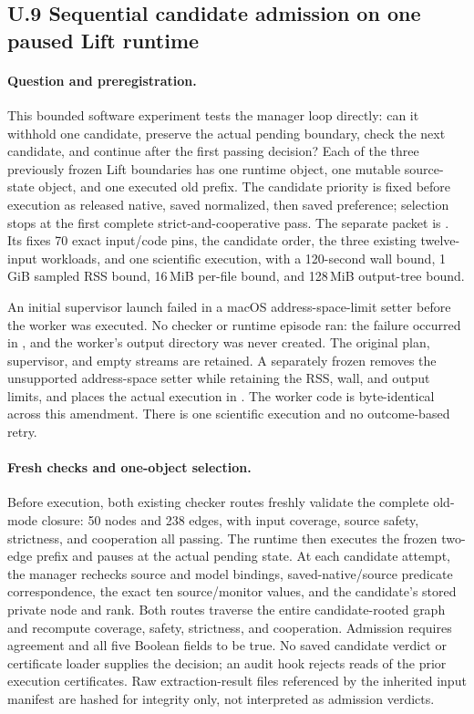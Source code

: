 \subsection*{U.9 Sequential candidate admission on one paused Lift runtime}
\label{supp:sequential-lift-manager}

\paragraph{Question and preregistration.}
This bounded software experiment tests the manager loop directly: can it
withhold one candidate, preserve the actual pending boundary, check the
next candidate, and continue after the first passing decision?
Each of the three previously frozen Lift boundaries has one runtime object,
one mutable source-state object, and one executed old prefix.
The candidate priority is fixed before execution as released native,
saved normalized, then saved preference; selection stops at the first
complete strict-and-cooperative pass.
The separate packet is
.
Its  fixes 70 exact input/code pins, the candidate order,
the three existing twelve-input workloads, and one scientific execution,
with a 120-second wall bound, 1\,GiB sampled RSS bound, 16\,MiB per-file
bound, and 128\,MiB output-tree bound.

An initial supervisor launch failed in a macOS address-space-limit
setter before the worker was executed. No checker or runtime episode
ran: the failure occurred in , and the worker's output
directory was never created. The original plan, supervisor, and empty
streams are retained. A separately frozen 
removes the unsupported address-space setter while retaining the RSS,
wall, and output limits, and places the actual execution in
. The worker code is byte-identical across this amendment.
There is one scientific execution and no outcome-based retry.

\paragraph{Fresh checks and one-object selection.}
Before execution, both existing checker routes freshly validate the
complete old-mode closure: 50 nodes and 238 edges, with input coverage,
source safety, strictness, and cooperation all passing.
The runtime then executes the frozen two-edge prefix and pauses at the
actual pending state. At each candidate attempt, the manager rechecks
source and model bindings, saved-native/source predicate correspondence,
the exact ten source/monitor values, and the candidate's stored private
node and rank. Both routes traverse the entire candidate-rooted graph
and recompute coverage, safety, strictness, and cooperation.
Admission requires agreement and all five Boolean fields to be true.
No saved candidate verdict or certificate loader supplies the decision;
an audit hook rejects reads of the prior execution certificates.
Raw extraction-result files referenced by the inherited input manifest
are hashed for integrity only, not interpreted as admission verdicts.

